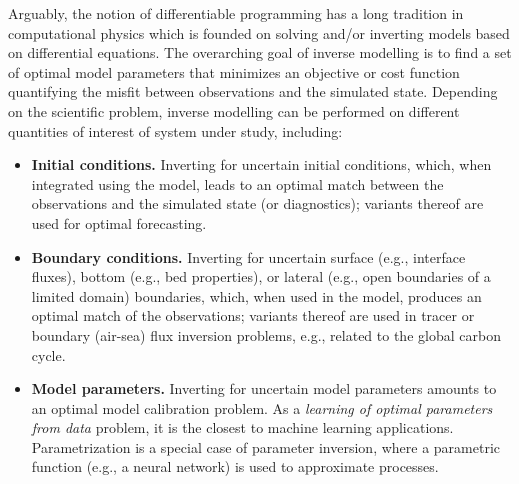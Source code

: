 Arguably, the notion of differentiable programming has a long tradition in computational physics which is founded on solving and/or inverting models based on differential equations.
The overarching goal of inverse modelling is to find a set of optimal model parameters that minimizes an objective or cost function quantifying the misfit between observations and the simulated state.
Depending on the scientific problem, inverse modelling can be performed on different quantities of interest of system under study, including:
\begin{itemize}
    \item \textbf{Initial conditions.} Inverting for uncertain initial conditions, which, when integrated using the model, leads to an optimal match between the observations and the simulated state (or diagnostics); variants thereof are used for optimal forecasting.
    \item \textbf{Boundary conditions.} Inverting for uncertain surface (e.g., interface fluxes), bottom (e.g., bed properties), or lateral (e.g., open boundaries of a limited domain) boundaries, which, when used in the model, produces an optimal match of the observations; variants thereof are used in tracer or boundary (air-sea) flux inversion problems, e.g., related to the global carbon cycle.
    \item \textbf{Model parameters.} Inverting for uncertain model parameters amounts to an optimal model calibration problem. As a \textit{learning of optimal parameters from data} problem, it is the closest to machine learning applications. Parametrization is a special case of parameter inversion, where a parametric function (e.g., a neural network) is used to approximate processes. 
\end{itemize}
